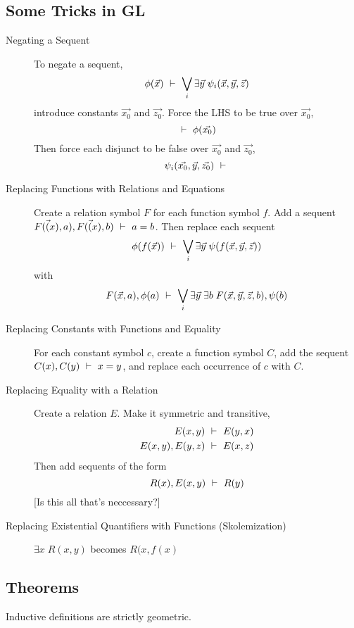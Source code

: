 \documentclass{article}
\begin{document}
\subsection{Some Tricks in GL}
\begin{description}

\item[Negating a Sequent]
To negate a sequent,
$$ \phi(\vec{x}) \ \vdash\ \bigvee_i \exists \vec{y}\; \psi_i(\vec{x}, \vec{y}, \vec{z}) $$
introduce constants $\vec{x_0}$ and $\vec{z_0}$. Force the LHS to be
true over $\vec{x_0}$,
$$ \ \vdash\ \phi(\vec{x_0}) $$
Then force each disjunct to be false over $\vec{x_0}$ and $\vec{z_0}$,
$$ \psi_i(\vec{x_0}, \vec{y}, \vec{z_0}) \ \vdash\  $$

\item[Replacing Functions with Relations and Equations]
Create a relation symbol $F$ for each function symbol $f$. Add a
sequent $F(\vec(x), a), F(\vec(x), b) \ \vdash\ a = b$. Then replace each
sequent
$$ \phi(f(\vec{x})) \ \vdash\ \bigvee_i \exists \vec{y}\; \psi(f(\vec{x}, \vec{y}, \vec{z})) $$
with
$$ F(\vec{x}, a), \phi(a) \ \vdash\ \bigvee_i \exists \vec{y}\; \exists b\;
              F(\vec{x}, \vec{y}, \vec{z}, b), \psi(b) $$

\item[Replacing Constants with Functions and Equality]
For each constant symbol $c$, create a function symbol $C$, add the
sequent $C(x), C(y) \ \vdash\ x = y$, and replace each occurrence of $c$
with $C$.

\item[Replacing Equality with a Relation]
Create a relation $E$. Make it symmetric and transitive,
\begin{align*}
E(x, y) & \ \vdash\ E(y, x) \\
E(x, y), E(y, z) & \ \vdash\ E(x, z)
\end{align*}
Then add sequents of the form
$$R(x), E(x, y) \ \vdash\ R(y)$$
[Is this all that's neccessary?]

\item[Replacing Existential Quantifiers with Functions (Skolemization)]
$\exists x\; R(x, y)$ becomes $R(x, f(x)$

\end{description}


\subsection{Theorems}

\begin{theorem}
Inductive definitions are strictly geometric.
\end{theorem}
\end{document}

